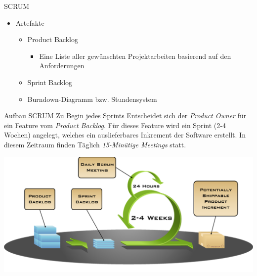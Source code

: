 \begin{defi}{SCRUM}
\begin{itemize}
\begin{itemize}
                  \item Sprint-Review
                  \item Sprint-Retrospektive
                  \item Tägliches 15-minütiges Scrum-Meeting
                        \begin{itemize}
                            \item Was hast du gestern getan?
                            \item Was wirst du heute tun?
                            \item Welche Hindernisse sind in deinem Weg?
                        \end{itemize}
              \end{itemize}
        \item Artefakte
              \begin{itemize}
                  \item Product Backlog
                        \begin{itemize}
                            \item Eine Liste aller gewünschten Projektarbeiten basierend auf den Anforderungen
                        \end{itemize}
                  \item Sprint Backlog
                  \item Burndown-Diagramm bzw. Stundensystem
              \end{itemize}
    \end{itemize}
\end{defi}

\begin{bonus}{Aufbau SCRUM}
    Zu Begin jedes Sprints Entscheidet sich der \emph{Product Owner} für ein Feature vom \emph{Product Backlog}.
    Für dieses Feature wird ein Sprint (2-4 Wochen) angelegt, welches ein auslieferbares Inkrement der Software erstellt.
    In diesem Zeitraum finden Täglich \emph{15-Minütige Meetings} statt.

    \includegraphics[width=\textwidth]{includes/figures/SCRUM.png}
\end{bonus}